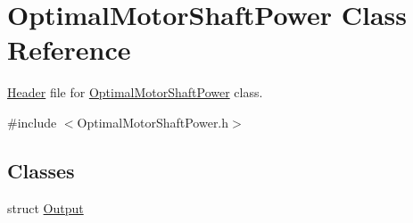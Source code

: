 \hypertarget{class_optimal_motor_shaft_power}{}\section{Optimal\+Motor\+Shaft\+Power Class Reference}
\label{class_optimal_motor_shaft_power}


\hyperlink{class_header}{Header} file for \hyperlink{class_optimal_motor_shaft_power}{Optimal\+Motor\+Shaft\+Power} class.  




{\ttfamily \#include $<$Optimal\+Motor\+Shaft\+Power.\+h$>$}

\subsection*{Classes}
\begin{DoxyCompactItemize}
\item 
struct \hyperlink{struct_optimal_motor_shaft_power_1_1_output}{Output}
\end{DoxyCompactItemize}
